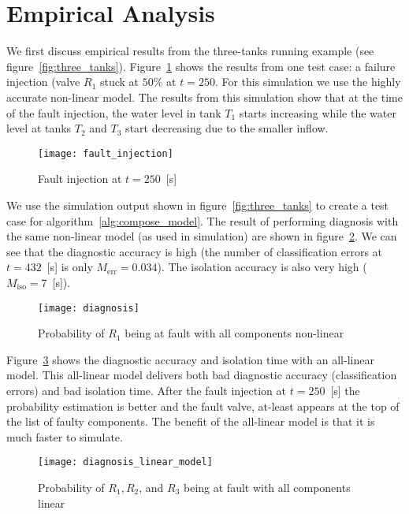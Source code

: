 \section{Empirical Analysis}
%
We first discuss empirical results from the three-tanks running
example (see
figure~\ref{fig:three_tanks}). Figure~\ref{fig:fault_injection} shows
the results from one test case: a failure injection (valve $R_1$ stuck
at $50$\% at $t = 250$. For this simulation we use the highly accurate
non-linear model. The results from this simulation show that at the
time of the fault injection, the water level in tank $T_1$ starts
increasing while the water level at tanks $T_2$ and $T_3$ start
decreasing due to the smaller inflow.
%
\begin{figure}[htb]
  \centering
  \texttt{[image: fault\_injection]}
  \caption{Fault injection at $t = 250$~[s]}
  \label{fig:fault_injection}
\end{figure}
\par
%
We use the simulation output shown in figure~\ref{fig:three_tanks} to
create a test case for algorithm~\ref{alg:compose_model}. The result
of performing diagnosis with the same non-linear model (as used in
simulation) are shown in figure~\ref{fig:diagnosis}. We can see that
the diagnostic accuracy is high (the number of classification errors
at $t = 432$~[s] is only $M_{\mathrm{err}} = 0.034$). The isolation
accuracy is also very high ($M_{\mathrm{iso}} = 7$~[s]).
%
\begin{figure}[htb]
  \centering
  \texttt{[image: diagnosis]}
  \caption{Probability of $R_1$ being at fault with all components non-linear}
  \label{fig:diagnosis}
\end{figure}
\par
%
Figure~\ref{fig:diagnosis_linear_model} shows the diagnostic accuracy
and isolation time with an all-linear model. This all-linear model
delivers both bad diagnostic accuracy (classification errors) and bad
isolation time. After the fault injection at $t = 250$~[s] the
probability estimation is better and the fault valve, at-least appears
at the top of the list of faulty components. The benefit of the
all-linear model is that it is much faster to simulate.
%
\begin{figure}[htb]
  \centering
  \texttt{[image: diagnosis\_linear\_model]}
  \caption{Probability of $R_1, R_2$, and $R_3$ being at fault with all components linear}
  \label{fig:diagnosis_linear_model}
\end{figure}
\par
